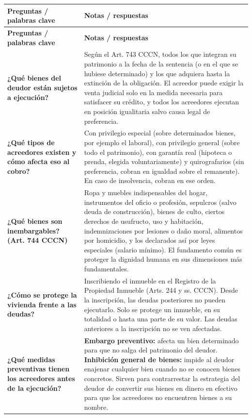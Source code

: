 \documentclass[12pt,oneside]{book}
\newcommand{\cornellinicio}{\begingroup\small\renewcommand{\arraystretch}{1.4}}
\newcommand{\cornellpregunta}[2]{\textbf{#1} & #2 \\ \hline}
\begin{document}
\cornellinicio
\begin{longtable}{|Q|Z|}
\hline
{}\textbf{Preguntas / palabras clave} & \textbf{Notas / respuestas} \\ \hline
\endfirsthead
\hline
{}\textbf{Preguntas / palabras clave} & \textbf{Notas / respuestas} \\ \hline
\endhead

\cornellpregunta{¿Qué bienes del deudor están sujetos a ejecución?}{%
Según el Art. 743 CCCN, todos los que integran su patrimonio a la fecha de la sentencia (o en el que se hubiese determinado) y los que adquiera hasta la extinción de la obligación. El acreedor puede exigir la venta judicial solo en la medida necesaria para satisfacer su crédito, y todos los acreedores ejecutan en posición igualitaria salvo causa legal de preferencia.}

\cornellpregunta{¿Qué tipos de acreedores existen y cómo afecta eso al cobro?}{%
Con privilegio especial (sobre determinados bienes, por ejemplo el laboral), con privilegio general (sobre todo el patrimonio), con garantía real (hipoteca o prenda, elegida voluntariamente) y quirografarios (sin preferencia, cobran en igualdad sobre el remanente). En caso de insolvencia, cobran en ese orden.
}

\cornellpregunta{¿Qué bienes son inembargables? (Art. 744 CCCN)}{%
Ropa y muebles indispensables del hogar, instrumentos del oficio o profesión, sepulcros (salvo deuda de construcción), bienes de culto, ciertos derechos de usufructo, uso y habitación, indemnizaciones por lesiones o daño moral, alimentos por homicidio, y los declarados así por leyes especiales (salario mínimo). El fundamento común es proteger la dignidad humana en sus dimensiones más fundamentales.}

\cornellpregunta{¿Cómo se protege la vivienda frente a las deudas?}{%
Inscribiendo el inmueble en el Registro de la Propiedad Inmueble (Arts. 244 y ss. CCCN). Desde la inscripción, las deudas posteriores no pueden ejecutarlo. Solo se protege un inmueble, en su totalidad o hasta una parte de su valor. Las deudas anteriores a la inscripción no se ven afectadas.}

\cornellpregunta{¿Qué medidas preventivas tienen los acreedores antes de la ejecución?}{%
\textbf{Embargo preventivo:} afecta un bien determinado para que no salga del patrimonio del deudor. \textbf{Inhibición general de bienes:} impide al deudor enajenar cualquier bien cuando no se conocen bienes concretos. Sirven para contrarrestar la estrategia del deudor de convertir sus bienes en dinero en efectivo para que los acreedores no encuentren bienes a su nombre.}


\end{longtable}
\end{document}
